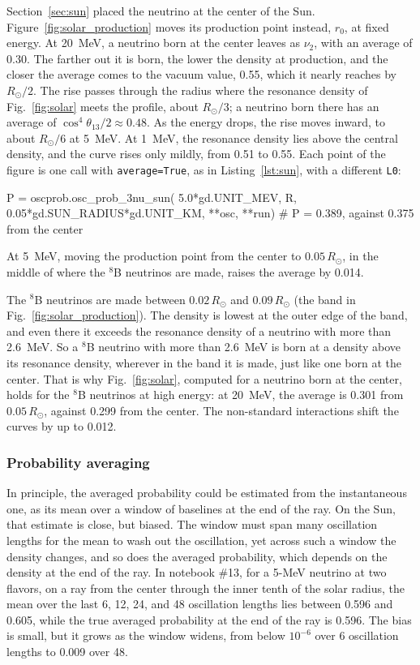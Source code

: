 \documentclass[final,5p,times,twocolumn,sort,compress]{elsarticle}
\makeatletter
\newcommand{\fig}{Fig.}
\DeclareRobustCommand{\_}{%
  \ifmmode\nfss@text{\textunderscore}\else\textunderscore\allowbreak\fi}
\newcommand{\figu}[1]{\fig~\ref{fig:#1}}
\makeatother
\begin{document}
Section~\ref{sec:sun} placed the neutrino at the center of the Sun. Figure~\ref{fig:solar_production} moves its production point instead, $r_0$, at fixed energy. At 20~MeV, a neutrino born at the center leaves as $\nu_2$, with an average of 0.30. The farther out it is born, the lower the density at production, and the closer the average comes to the vacuum value, 0.55, which it nearly reaches by $R_\odot/2$. The rise passes through the radius where the resonance density of \figu{solar} meets the profile, about $R_\odot/3$; a neutrino born there has an average of $\cos^4\theta_{13}/2 \approx 0.48$. As the energy drops, the rise moves inward, to about $R_\odot/6$ at 5~MeV. At 1~MeV, the resonance density lies above the central density, and the curve rises only mildly, from 0.51 to 0.55. Each point of the figure is one call with {\tt average=True}, as in Listing~\ref{lst:sun}, with a different {\tt L0}:
\begin{pysnip}
P = oscprob.osc_prob_3nu_sun(
 5.0*gd.UNIT_MEV, R,
 0.05*gd.SUN_RADIUS*gd.UNIT_KM,
 **osc, **run)
# P = 0.389, against 0.375 from the center
\end{pysnip}
At 5~MeV, moving the production point from the center to $0.05\,R_\odot$, in the middle of where the $^8$B neutrinos are made, raises the average by 0.014.

The $^8$B neutrinos are made between $0.02\,R_\odot$ and $0.09\,R_\odot$ (the band in \figu{solar_production}). The density is lowest at the outer edge of the band, and even there it exceeds the resonance density of a neutrino with more than 2.6~MeV. So a $^8$B neutrino with more than 2.6~MeV is born at a density above its resonance density, wherever in the band it is made, just like one born at the center. That is why \figu{solar}, computed for a neutrino born at the center, holds for the $^8$B neutrinos at high energy: at 20~MeV, the average is 0.301 from $0.05\,R_\odot$, against 0.299 from the center. The non-standard interactions shift the curves by up to 0.012.


\subsubsection{Probability averaging}
\label{sec:averaging_is_not_estimating}

In principle, the averaged probability could be estimated from the instantaneous one, as its mean over a window of baselines at the end of the ray. On the Sun, that estimate is close, but biased. The window must span many oscillation lengths for the mean to wash out the oscillation, yet across such a window the density changes, and so does the averaged probability, which depends on the density at the end of the ray. In notebook \#13, for a 5-MeV neutrino at two flavors, on a ray from the center through the inner tenth of the solar radius, the mean over the last 6, 12, 24, and 48 oscillation lengths lies between 0.596 and 0.605, while the true averaged probability at the end of the ray is 0.596. The bias is small, but it grows as the window widens, from below $10^{-6}$ over 6 oscillation lengths to 0.009 over 48.
\end{document}
